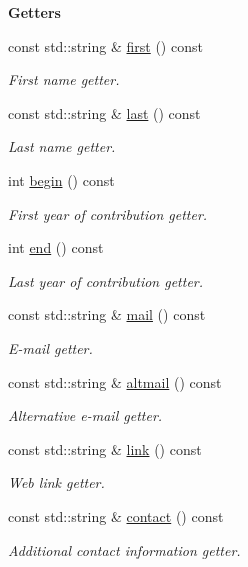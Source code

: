 \begin{Indent}{\bf Getters}\par
\begin{DoxyCompactItemize}
\item 
const std\-::string \& \hyperlink{exceptionmagrathea_1_1AboutPeople_a147a4e70743b3c13f5536916765c4051}{first} () const 
\begin{DoxyCompactList}\small\item\em First name getter. \end{DoxyCompactList}\item 
const std\-::string \& \hyperlink{exceptionmagrathea_1_1AboutPeople_a39f2ffe6bb01aee2f8ff1ab9ebce7995}{last} () const 
\begin{DoxyCompactList}\small\item\em Last name getter. \end{DoxyCompactList}\item 
int \hyperlink{exceptionmagrathea_1_1AboutPeople_a4f6f1d6dbc2f0cf54272a8338db3a0a5}{begin} () const 
\begin{DoxyCompactList}\small\item\em First year of contribution getter. \end{DoxyCompactList}\item 
int \hyperlink{exceptionmagrathea_1_1AboutPeople_a9cff6090ddf07b355f87a7cd448fc14d}{end} () const 
\begin{DoxyCompactList}\small\item\em Last year of contribution getter. \end{DoxyCompactList}\item 
const std\-::string \& \hyperlink{exceptionmagrathea_1_1AboutPeople_a7423a3514526c20db50a7e7967d6ca5c}{mail} () const 
\begin{DoxyCompactList}\small\item\em E-\/mail getter. \end{DoxyCompactList}\item 
const std\-::string \& \hyperlink{exceptionmagrathea_1_1AboutPeople_aa3c59e83bb53ce93d951e28a747ad4f7}{altmail} () const 
\begin{DoxyCompactList}\small\item\em Alternative e-\/mail getter. \end{DoxyCompactList}\item 
const std\-::string \& \hyperlink{exceptionmagrathea_1_1AboutPeople_a0ffe2b8fc61b1f7a729e2f58d9b0e89f}{link} () const 
\begin{DoxyCompactList}\small\item\em Web link getter. \end{DoxyCompactList}\item 
const std\-::string \& \hyperlink{exceptionmagrathea_1_1AboutPeople_a6925ba38bf93060af9295a9e8f4089f2}{contact} () const 
\begin{DoxyCompactList}\small\item\em Additional contact information getter. \end{DoxyCompactList}\end{DoxyCompactItemize}
\end{Indent}

